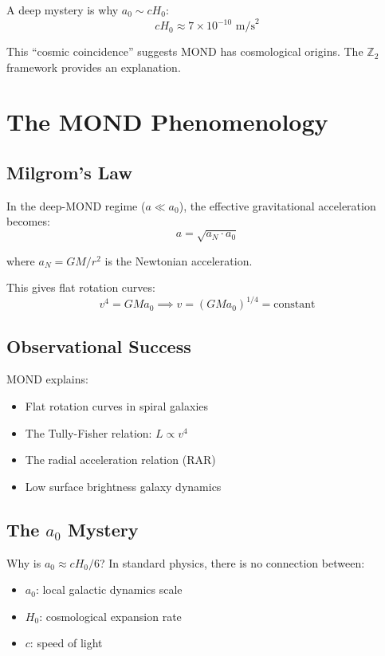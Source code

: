 \documentclass[12pt,a4paper]{article}
\begin{document}
A deep mystery is why $a_0 \sim cH_0$:
\begin{equation}
cH_0 \approx 7 \times 10^{-10} \text{ m/s}^2
\end{equation}

This ``cosmic coincidence'' suggests MOND has cosmological origins. The $\mathbb{Z}_2$ framework provides an explanation.

\section{The MOND Phenomenology}

\subsection{Milgrom's Law}

In the deep-MOND regime ($a \ll a_0$), the effective gravitational acceleration becomes:
\begin{equation}
a = \sqrt{a_N \cdot a_0}
\end{equation}

where $a_N = GM/r^2$ is the Newtonian acceleration.

This gives flat rotation curves:
\begin{equation}
v^4 = GMa_0 \implies v = (GMa_0)^{1/4} = \text{constant}
\end{equation}

\subsection{Observational Success}

MOND explains:
\begin{itemize}
    \item Flat rotation curves in spiral galaxies
    \item The Tully-Fisher relation: $L \propto v^4$
    \item The radial acceleration relation (RAR)
    \item Low surface brightness galaxy dynamics
\end{itemize}

\subsection{The $a_0$ Mystery}

Why is $a_0 \approx cH_0/6$? In standard physics, there is no connection between:
\begin{itemize}
    \item $a_0$: local galactic dynamics scale
    \item $H_0$: cosmological expansion rate
    \item $c$: speed of light
\end{itemize}
\end{document}
